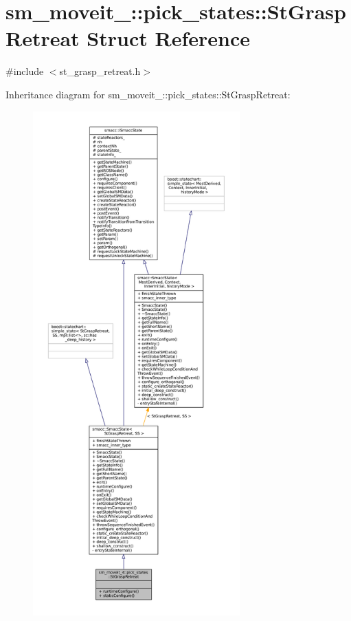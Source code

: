 \hypertarget{structsm__moveit__4_1_1pick__states_1_1StGraspRetreat}{}\section{sm\+\_\+moveit\+\_\+:\+:pick\+\_\+states\+:\+:St\+Grasp\+Retreat Struct Reference}
\label{structsm__moveit__4_1_1pick__states_1_1StGraspRetreat}


{\ttfamily \#include $<$st\+\_\+grasp\+\_\+retreat.\+h$>$}



Inheritance diagram for sm\+\_\+moveit\+\_\+:\+:pick\+\_\+states\+:\+:St\+Grasp\+Retreat\+:
\nopagebreak
\begin{figure}[H]
\begin{center}
\leavevmode
\includegraphics[height=550pt]{structsm__moveit__4_1_1pick__states_1_1StGraspRetreat__inherit__graph}
\end{center}
\end{figure}


